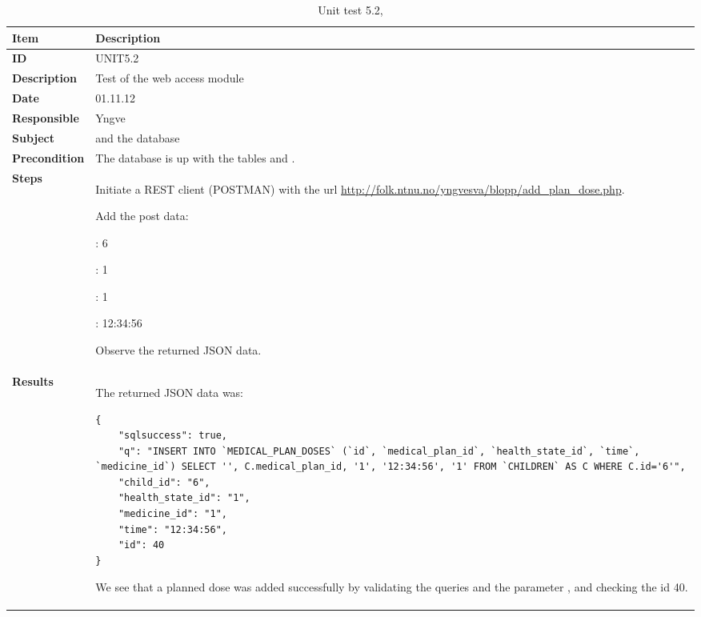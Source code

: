 \begin{table} %
	\begin{center}
		\begin{tabular}{|p{3.0cm}|p{14.0cm}|}
			\hline
			\bf{Item} & \bf{Description}\\
			\hline
			\bf{ID} & UNIT5.2\\
			\bf{Description} & Test of the web access module \code{add\_plan\_dose.php}\\
			\bf{Date} & 01.11.12\\
			\bf{Responsible} & Yngve\\
			\bf{Subject} & \code{add\_plan\_dose.php} and the database\\
			\bf{Precondition} & The database is up with the tables \code{MEDICAL\_PLAN\_DOSES} and \code{CHILDREN}.\\
			\bf{Steps} &
			\begin{tabulenum}
				\item Initiate a REST client (POSTMAN) with the url \url{http://folk.ntnu.no/yngvesva/blopp/add\_plan\_dose.php}.
				\item Add the post data:
					\begin{tabulitem}
					  \item \code{child\_id}: 6
					  \item \code{health\_state\_id}: 1
					  \item \code{medicine\_id}: 1
					  \item \code{time}: 12:34:56
					\end{tabulitem}
				\item Observe the returned JSON data.
			\end{tabulenum}\\
			\hline
			\bf{Results} & The returned JSON data was:
\begin{lstlisting}[caption=JSON result from \code{add\_plan\_dose.php}]
{
    "sqlsuccess": true,
    "q": "INSERT INTO `MEDICAL_PLAN_DOSES` (`id`, `medical_plan_id`, `health_state_id`, `time`, `medicine_id`) SELECT '', C.medical_plan_id, '1', '12:34:56', '1' FROM `CHILDREN` AS C WHERE C.id='6'",
    "child_id": "6",
    "health_state_id": "1",
    "medicine_id": "1",
    "time": "12:34:56",
    "id": 40
}
\end{lstlisting}
				We see that a planned dose was added successfully by validating the queries and the parameter \code{sqlsuccess}, and checking the id 40.\\
			\hline
		\end{tabular}
	\end{center}
	\label{tab:unit5.2}
	\caption{Unit test 5.2, }
\end{table}

